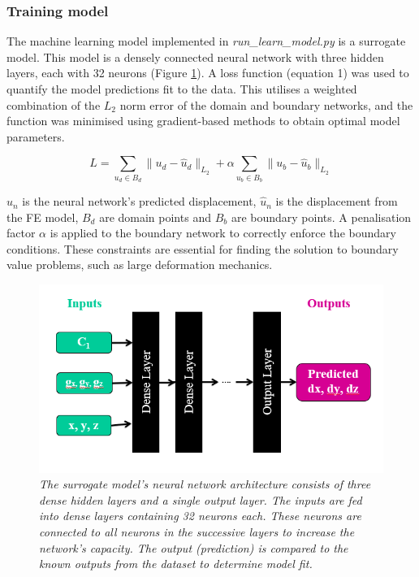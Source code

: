 \documentclass[11pt]{article}
\begin{document}
\subsubsection{Training model}
The machine learning model implemented in \textit{run\_learn\_model.py} is a surrogate model. This model is a densely connected neural network with three hidden layers, each with 32 neurons (Figure \ref{fig1}). A loss function (equation 1) was used to quantify the model predictions fit to the data. This utilises a weighted combination of the $L_{2}$ norm error of the domain and boundary networks, and the function was minimised using gradient-based methods to obtain optimal model parameters.

\begin{equation}
    L = \sum_{u_{d}\in B_{d}}\|u_{d}-\hat{u}_{d}\|_{L_{2}} + \alpha\sum_{u_{b}\in B_{b}}\|u_{b}-\hat{u}_{b}\|_{L_{2}}
\end{equation}

$u_{n}$ is the neural network's predicted displacement, $\hat{u}_{n}$ is the displacement from the FE model, $B_{d}$ are domain points and $B_{b}$ are boundary points. A penalisation factor $\alpha$ is applied to the boundary network to correctly enforce the boundary conditions. These constraints are essential for finding the solution to boundary value problems, such as large deformation mechanics.

\begin{figure}[H]
    \centering
    \includegraphics[scale=0.75]{Images/breast/machine_learning/surrogate_network.png}
    \caption{\textit{\label{fig1}The surrogate model's neural network architecture consists of three dense hidden layers and a single output layer. The inputs are fed into dense layers containing 32 neurons each. These neurons are connected to all neurons in the successive layers to increase the network's capacity. The output (prediction) is compared to the known outputs from the dataset to determine model fit.}}
\end{figure}
\end{document}
